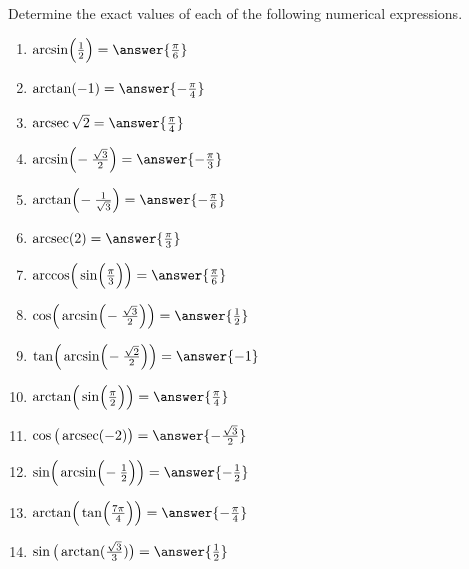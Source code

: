 \documentclass{ximera}
\author{Elizabeth Campolongo}
\begin{document}
\begin{exercise}

Determine the exact values of each of the following numerical expressions.  %
%
\begin{enumerate}
\item $\arcsin\!\Big(\frac{1}{2}\Big) = \answer{\frac{\pi}{6}}$
%
\item $\arctan(-1) = \answer{-\frac{\pi}{4}}$
%
\item $\arcsec{\sqrt{2}} = \answer{\frac{\pi}{4}}$
%
\item $\arcsin\!\Big(\!-\frac{\sqrt{3}}{2}\Big) = \answer{-\frac{\pi}{3}}$
%
\item $\arctan\!\Big(\!-\frac{1}{\sqrt{3}}\Big) = \answer{-\frac{\pi}{6}}$
%
\item $\arcsec(2) = \answer{\frac{\pi}{3}}$
%
\item $\arccos\!\Big(\sin\!\Big(\frac{\pi}{3}\Big)\Big) = \answer{\frac{\pi}{6}}$
%
\item $\cos\!\Big(\arcsin\!\Big(\!-\frac{\sqrt{3}}{2}\Big)\Big) = \answer{\frac{1}{2}}$
%
\item $\tan\!\Big(\arcsin\!\Big(\!-\frac{\sqrt{2}}{2}\Big)\Big) = \answer{-1}$
%
\item $\arctan\!\Big(\sin\!\Big(\frac{\pi}{2}\Big)\Big) = \answer{\frac{\pi}{4}}$
%
\item $\cos\big(\arcsec(-2)\big) = \answer{-\frac{\sqrt{3}}{2}}$
%
\item $\sin\!\Big(\arcsin\!\Big(\!-\frac{1}{2}\Big)\Big) = \answer{-\frac{1}{2}}$
%
\item $\arctan\!\Big(\tan\!\Big(\frac{7\pi}{4}\Big)\Big) = \answer{-\frac{\pi}{4}}$
%
\item $\sin\big(\arctan(\frac{\sqrt{3}}{3})\big) = \answer{\frac{1}{2}}$
%
\end{enumerate}
\end{exercise}
\end{document}
